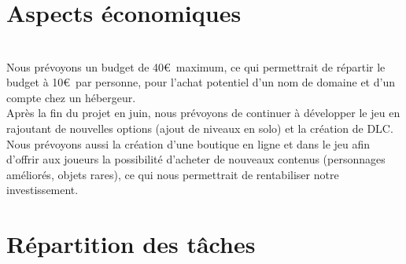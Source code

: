 \documentclass[titlepage, 13px, a4paper]{article}
\begin{document}
\section{Aspects économiques}
\paragraph{} \hspace{0pt} \\
Nous prévoyons un budget de 40\euro ~maximum, ce qui permettrait de répartir le budget à 10\euro ~par personne, 
pour l’achat potentiel d’un nom de domaine et d’un compte chez un hébergeur.
\\
Après la fin du projet en juin, nous prévoyons de continuer à développer le jeu en rajoutant de nouvelles options (ajout de niveaux en solo) 
et la création de DLC. 
Nous prévoyons aussi la création d’une boutique en ligne et dans le jeu afin d’offrir aux joueurs la possibilité 
d’acheter de nouveaux contenus (personnages améliorés, objets rares), ce qui nous permettrait de rentabiliser notre investissement.

\newpage
\section{Répartition des tâches}
\end{document}
